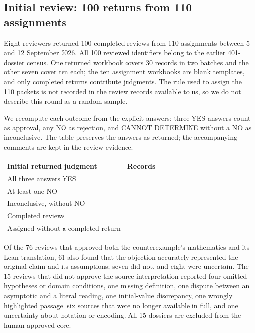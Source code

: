 \subsection{Initial review: 100 returns from 110 assignments}
\label{app:human-verification}
Eight reviewers returned 100 completed reviews from 110 assignments between 5 and 12 September 2026. All 100 reviewed identifiers belong to the earlier 401-dossier census. One returned workbook covers 30 records in two batches and the other seven cover ten each; the ten assignment workbooks are blank templates, and only completed returns contribute judgments. The rule used to assign the 110 packets is not recorded in the review records available to us, so we do not describe this round as a random sample.

We recompute each outcome from the explicit answers: three YES answers count as approval, any NO as rejection, and CANNOT DETERMINE without a NO as inconclusive. The table preserves the answers as returned; the accompanying comments are kept in the review evidence.

\begin{center}
\begin{tabular}{lr}
\toprule
Initial returned judgment & Records \\
\midrule
All three answers YES & \humanReviewAllYes{} \\
At least one NO & \humanReviewRejected{} \\
Inconclusive, without NO & \humanReviewInconclusive{} \\
\midrule
Completed reviews & \humanReviewReturned{} \\
Assigned without a completed return & \humanReviewMissing{} \\
\bottomrule
\end{tabular}
\end{center}

Of the 76 reviews that approved both the counterexample's mathematics and its Lean translation, 61 also found that the objection accurately represented the original claim and its assumptions; seven did not, and eight were uncertain. The 15 reviews that did not approve the source interpretation reported four omitted hypotheses or domain conditions, one missing definition, one dispute between an asymptotic and a literal reading, one initial-value discrepancy, one wrongly highlighted passage, six sources that were no longer available in full, and one uncertainty about notation or encoding. All 15 dossiers are excluded from the human-approved core.

